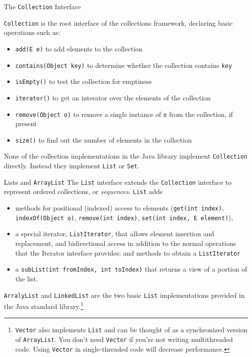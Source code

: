 \documentclass{beamer}
\begin{document}
\begin{frame}[fragile]{The {\tt Collection} Interface}


{\tt Collection} is the root interface of the collections framework, declaring basic operations such as:
\begin{itemize}
\item {\tt add(E e)} to add elements to the collection
\item {\tt contains(Object key)} to determine whether the collection contains {\tt key}
\item {\tt isEmpty()} to test the collection for emptiness
\item {\tt iterator()} to get an interator over the elements of the collection
\item {\tt remove(Object o)} to remove a single instance of {\tt o} from the collection, if present
\item {\tt size()} to find out the number of elements in the collection
\end{itemize}
None of the collection implementations in the Java library implement {\tt Collection} directly.  Instead they implement {\tt List} or {\tt Set}.

\end{frame}


\begin{frame}[fragile]{Lists and {\tt ArrayList}}
\vspace{-.05in}
The {\tt List} interface extends the {\tt Collection} interface to represent ordered collections, or {\it sequences}.  {\tt List} adds
\vspace{-.05in}
\begin{itemize}
\item methods for positional (indexed) access to elements ({\tt get(int index)}, {\tt indexOf(Object o)}, {\tt remove(int index)}, {\tt set(int index, E element)}),
\item a special iterator, {\tt ListIterator}, that allows element insertion and replacement, and bidirectional access in addition to the normal operations that the Iterator interface provides; and methods to obtain a {\tt ListIterator}
\item a {\tt subList(int fromIndex, int toIndex)} that returns a view of a portion of the list.
\end{itemize}
{\tt ArralyList} and {\tt LinkedList} are the two basic {\tt List} implementations provided in the Java standard library.\footnote{{\tt Vector} also implements {\tt List} and can be thought of as a synchronized version of {\tt ArrayList}.  You don't need {\tt Vector} if you're not writing multithreaded code.  Using {\tt Vector} in single-threaded code will decrease performance.}
\end{frame}
\end{document}
